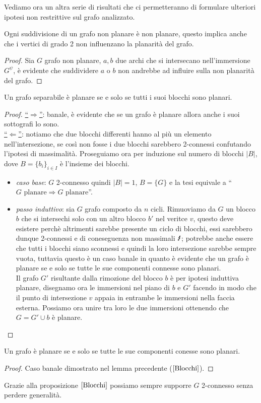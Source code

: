 Vediamo ora un altra serie di risultati che ci permetteranno di formulare ulteriori ipotesi non restrittive sul grafo analizzato.
\begin{proposizione}
    Ogni suddivisione di un grafo non planare è non planare, questo implica anche che i vertici di grado 2 non influenzano la planarità del grafo.
    \begin{proof}
        Sia \(G\) grafo non planare, \(a,b\) due archi che si intersecano nell'immersione \(G^\psi\), è evidente che suddividere \(a\) o \(b\) non andrebbe ad influire sulla non planarità del grafo.
    \end{proof}
\end{proposizione}
\begin{proposizione}\label{Blocchi}
    Un grafo separabile è planare se e solo se tutti i suoi blocchi sono planari.
    \begin{proof}
        \underline{“\(\Rightarrow\)”}: banale, è evidente che se un grafo è planare allora anche i suoi sottografi lo sono.\\
        \underline{“\(\Leftarrow\)”}: notiamo che due blocchi differenti hanno al più un elemento nell'intersezione, se così non fosse i due blocchi sarebbero 2-connessi confutando l'ipotesi di massimalità. Proseguiamo ora per induzione sul numero di blocchi \(|B|\), dove \(B={\{b_i\}}_{i \in I}\) è l'insieme dei blocchi.
        \begin{itemize}
            \item \textit{caso base}: \(G\) 2-connesso quindi \(|B|=1\), \(B=\{G\}\) e la tesi equivale a “\(G \text{ planare} \Rightarrow G \text{ planare}\)”.
            \item \textit{passo induttivo}: sia \(G\) grafo composto da \(n\) cicli. Rimuoviamo da \(G\) un blocco \(b\) che si intersechi solo con un altro blocco \(b'\) nel veritce \(v\), questo deve esistere perchè altrimenti sarebbe presente un ciclo di blocchi, essi sarebbero dunque 2-connessi e di coneseguenza non massimali \(\text{\Lightning}\); 
            potrebbe anche essere che tutti i blocchi siano sconnessi e quindi la loro intersezione sarebbe sempre vuota, tuttavia questo è un caso banale in quanto è evidente che un grafo è planare se e solo se tutte le sue componenti connesse sono planari. 
            \\ Il grafo \(G'\) risultante dalla rimozione del blocco \(b\) è per ipotesi induttiva planare, disegnamo ora le immersioni nel piano di \(b\) e \(G'\) facendo in modo che il punto di intersezione \(v\) appaia in entrambe le immersioni nella faccia esterna. Possiamo ora unire tra loro le due immersioni ottenendo che \(G=G' \cup b\) è planare.
        \end{itemize}
    \end{proof}
\end{proposizione}
\begin{lemma}
    Un grafo è planare se e solo se tutte le sue componenti conesse sono planari.
    \begin{proof}
        Caso banale dimostrato nel lemma precedente (\(\ref{Blocchi}\)).
    \end{proof}
\end{lemma}
Grazie alla proposizione \(\ref{Blocchi}\) possiamo sempre supporre \(G\) 2-connesso senza perdere generalità.
